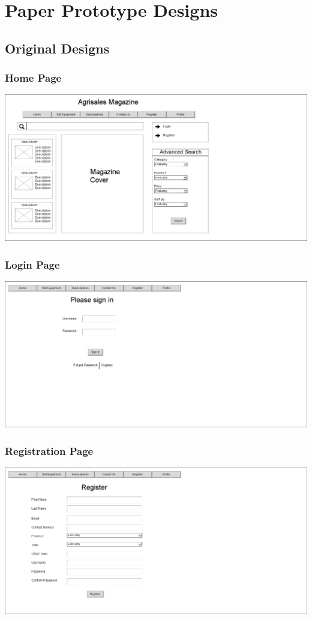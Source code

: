 \documentclass[11pt]{article}
\begin{document}


\tableofcontents

\listoffigures

\newpage

\section{Paper Prototype Designs}
	
	\subsection{Original Designs}
	
	\subsubsection{Home Page}
		\includegraphics[width=0.75\linewidth]{../Images/Agrisales-HomePage}
		
	\subsubsection{Login Page}
		\includegraphics[width=0.75\linewidth]{../Images/Agrisales-LoginPage}
		
	\subsubsection{Registration Page}
		\includegraphics[width=0.75\linewidth]{../Images/Agrisales-RegistrationPage}
		
\end{document}
